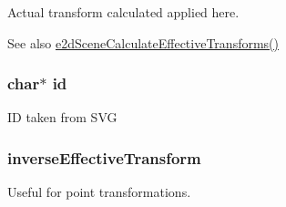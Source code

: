 Actual transform calculated applied here. \begin{DoxySeeAlso}{See also}
\hyperlink{group__e2dScene_ga6981f2448904c96723449cb84ffb4d8a}{e2d\-Scene\-Calculate\-Effective\-Transforms()} 
\end{DoxySeeAlso}
\hypertarget{structe2dElement_aecb3b0d045ada529257a2fbf8f829599}{
\subsubsection[{id}]{\setlength{\rightskip}{0pt plus 5cm}char$\ast$ {\bf id}}}\label{structe2dElement_aecb3b0d045ada529257a2fbf8f829599}
I\-D taken from S\-V\-G \hypertarget{structe2dElement_a5e6d7341f2dbef1923b0a3fcc13781c6}{
\subsubsection[{inverse\-Effective\-Transform}]{ {\bf inverse\-Effective\-Transform}}}\label{structe2dElement_a5e6d7341f2dbef1923b0a3fcc13781c6}
Useful for point transformations.

